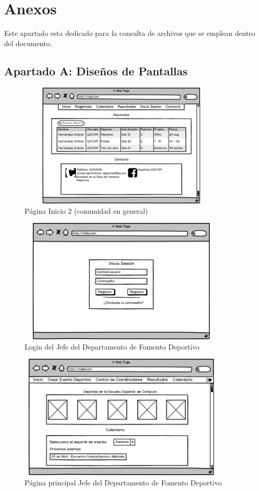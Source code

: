 \chapter{Anexos}
	\noident Este apartado esta dedicado para la consulta de archivos que se emplean dentro del documento. 
	\section{Apartado A: Diseños de Pantallas}
	
		\begin{figure}[hbt!]
			\centering
			\includegraphics[width=10cm, height=6cm]{Imagenes/Disenos/p20Iniciogeneral1.png}
			\caption{Página Inicio 2 (comunidad en general)}
			\label{Iniciogeneral1}
		\end{figure}
	
		\begin{figure}[hbt!]
			\centering
			\includegraphics[width=10cm, height=6cm]{Imagenes/Disenos/p2LoginJFD.png}
			\caption{Login del Jefe del Departamento de Fomento Deportivo}
			\label{LoginJFD}
		\end{figure}
	
		\begin{figure}[hbt!]
			\centering
			\includegraphics[width=10cm, height=6cm]{Imagenes/Disenos/p3InicioJefeFD.png}
			\caption{Página principal Jefe del Departamento de Fomento Deportivo}
			\label{IniciogeneralJFD}
		\end{figure}
			\pagebreak
	
